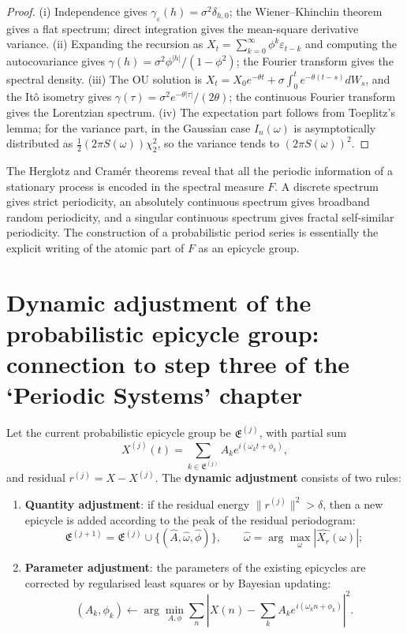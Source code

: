 \begin{proof}
(i) Independence gives $\gamma_\varepsilon(h)=\sigma^2\delta_{h,0}$; the Wiener--Khinchin theorem gives a flat spectrum; direct integration gives the mean-square derivative variance.
(ii) Expanding the recursion as $X_t=\sum_{k=0}^\infty\phi^k\varepsilon_{t-k}$ and computing the autocovariance gives $\gamma(h)=\sigma^2\phi^{|h|}/(1-\phi^2)$; the Fourier transform gives the spectral density.
(iii) The OU solution is $X_t=X_0e^{-\theta t}+\sigma\int_0^t e^{-\theta(t-s)}dW_s$, and the Itô isometry gives $\gamma(\tau)=\sigma^2 e^{-\theta|\tau|}/(2\theta)$; the continuous Fourier transform gives the Lorentzian spectrum.
(iv) The expectation part follows from Toeplitz's lemma; for the variance part, in the Gaussian case $I_n(\omega)$ is asymptotically distributed as $\frac12(2\pi S(\omega))\chi^2_2$, so the variance tends to $(2\pi S(\omega))^2$.
\end{proof}

\begin{remark}\label{rem:spectral_period_relation}
The Herglotz and Cramér theorems reveal that all the periodic information of a stationary process is encoded in the spectral measure $F$. A discrete spectrum gives strict periodicity, an absolutely continuous spectrum gives broadband random periodicity, and a singular continuous spectrum gives fractal self-similar periodicity. The construction of a probabilistic period series is essentially the explicit writing of the atomic part of $F$ as an epicycle group.
\end{remark}

\section{Dynamic adjustment of the probabilistic epicycle group: connection to step three of the `Periodic Systems' chapter}
\label{sec:prob_adaptive}

\begin{definition}\label{def:prob_adaptive_adjustment}
Let the current probabilistic epicycle group be $\mathfrak E^{(j)}$, with partial sum
\[
X^{(j)}(t)=\sum_{k\in\mathfrak E^{(j)}}A_k e^{i(\omega_k t+\phi_k)},
\]
and residual $r^{(j)}=X-X^{(j)}$. The \textbf{dynamic adjustment} consists of two rules:
\begin{enumerate}[label=(\roman*)]
    \item \textbf{Quantity adjustment}: if the residual energy $\|r^{(j)}\|^2>\delta$, then a new epicycle is added according to the peak of the residual periodogram:
    \[
    \mathfrak E^{(j+1)}=\mathfrak E^{(j)}\cup\{(\hat A,\hat\omega,\hat\phi)\},\qquad
    \hat\omega=\arg\max_\omega |\widehat{X_r}(\omega)|;
    \]
    \item \textbf{Parameter adjustment}: the parameters of the existing epicycles are corrected by regularised least squares or by Bayesian updating:
    \[
    (A_k,\phi_k)\leftarrow\arg\min_{A,\phi}\sum_n\left|X(n)-\sum_kA_ke^{i(\omega_kn+\phi_k)}\right|^2.
    \]
\end{enumerate}
\end{definition}

